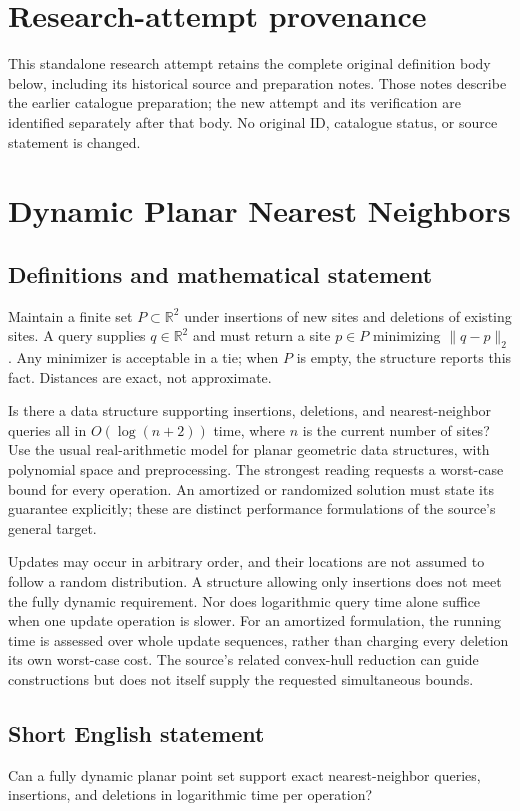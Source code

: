 \documentclass[11pt,a4paper]{article}
\begin{document}
\section*{Research-attempt provenance}
This standalone research attempt retains the complete original definition body below,
including its historical source and preparation notes. Those notes describe the
earlier catalogue preparation; the new attempt and its verification are identified
separately after that body. No original ID, catalogue status, or source statement is changed.

\section*{Dynamic Planar Nearest Neighbors}\label{statement}

\subsection{Definitions and mathematical statement}
Maintain a finite set $P\subset\mathbb R^2$ under insertions of
new sites and deletions of existing sites. A query supplies
$q\in\mathbb R^2$ and must return a site $p\in P$ minimizing
$\|q-p\|_2$. Any minimizer is acceptable in a tie; when $P$ is
empty, the structure reports this fact. Distances are exact,
not approximate.

Is there a data structure supporting insertions, deletions,
and nearest-neighbor queries all in $O(\log(n+2))$ time, where
$n$ is the current number of sites? Use the usual real-arithmetic
model for planar geometric data structures, with polynomial
space and preprocessing. The strongest reading requests a
worst-case bound for every operation. An amortized or randomized
solution must state its guarantee explicitly; these are distinct
performance formulations of the source's general target.

Updates may occur in arbitrary order, and their locations are
not assumed to follow a random distribution. A structure allowing
only insertions does not meet the fully dynamic requirement.
Nor does logarithmic query time alone suffice when one update
operation is slower. For an amortized formulation, the running
time is assessed over whole update sequences, rather than
charging every deletion its own worst-case cost. The source's
related convex-hull reduction can guide constructions but does
not itself supply the requested simultaneous bounds.
\subsection{Short English statement}
Can a fully dynamic planar point set support exact nearest-neighbor queries, insertions, and deletions in logarithmic time per operation?
\end{document}
